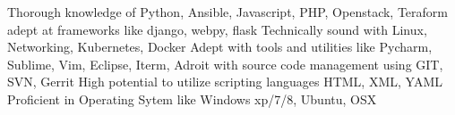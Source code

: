 
\begin{cvskills}
  \cvskill
    {Thorough knowledge of }
    {Python, Ansible, Javascript, PHP, Openstack, Teraform}
  \cvskill
    {adept at frameworks like}
    {django, webpy, flask}
  \cvskill
    {Technically sound with}
    {Linux, Networking, Kubernetes, Docker}
  \cvskill
    {Adept with tools and utilities like}
    {Pycharm, Sublime, Vim, Eclipse, Iterm, }
  \cvskill
    {Adroit with source code management using}
    {GIT, SVN, Gerrit}
  \cvskill
    {High potential to utilize scripting languages}
    {HTML, XML, YAML}
  \cvskill
  {Proficient in Operating Sytem like}
  {Windows xp/7/8, Ubuntu, OSX}
\end{cvskills}